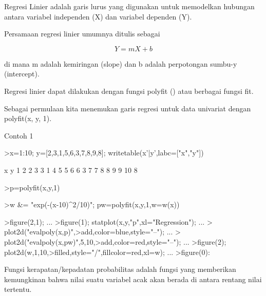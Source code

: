 \documentclass{article}
\begin{document}
\begin{eulernotebook}
\begin{eulercomment}
\begin{eulercomment}
\begin{eulercomment}
\begin{eulercomment}
\begin{eulercomment}
Regresi Linier adalah garis lurus yang digunakan untuk memodelkan
hubungan antara variabel independen (X) dan variabel dependen (Y).

Persamaan regresi linier umumnya ditulis sebagai\\
\end{eulercomment}
\begin{eulerformula}
\[
Y=mX+b
\]
\end{eulerformula}
\begin{eulercomment}
di mana m adalah kemiringan (slope) dan b adalah perpotongan sumbu-y
(intercept).

Regresi linier dapat dilakukan dengan fungsi polyfit () atau berbagai
fungsi fit.

Sebagai permulaan kita menemukan garis regresi untuk data univariat
dengan polyfit(x, y, 1).

\end{eulercomment}
\begin{eulercomment}
Contoh 1
\end{eulercomment}
\begin{eulerprompt}
>x=1:10; y=[2,3,1,5,6,3,7,8,9,8]; writetable(x'|y',labc=["x","y"])
\end{eulerprompt}
\begin{euleroutput}
           x         y
           1         2
           2         3
           3         1
           4         5
           5         6
           6         3
           7         7
           8         8
           9         9
          10         8
\end{euleroutput}
\begin{eulerprompt}
>p=polyfit(x,y,1)
\end{eulerprompt}
\begin{euleroutput}
  [0.733333,  0.812121]
\end{euleroutput}
\begin{eulerprompt}
>w &= "exp(-(x-10)^2/10)"; pw=polyfit(x,y,1,w=w(x))
\end{eulerprompt}
\begin{euleroutput}
  [4.71566,  0.38319]
\end{euleroutput}
\begin{eulerprompt}
>figure(2,1); ...
>figure(1); statplot(x,y,"p",xl="Regression"); ...
>  plot2d("evalpoly(x,p)",>add,color=blue,style="--"); ...
>  plot2d("evalpoly(x,pw)",5,10,>add,color=red,style="--"); ...
>figure(2); plot2d(w,1,10,>filled,style="/",fillcolor=red,xl=w); ...
>figure(0):
\end{eulerprompt}
\begin{eulercomment}
Fungsi kerapatan/kepadatan probabilitas adalah fungsi yang memberikan
kemungkinan bahwa nilai suatu variabel acak akan berada di antara
rentang nilai tertentu.


\end{eulercomment}
\end{eulercomment}
\end{eulercomment}
\end{eulercomment}
\end{eulercomment}
\end{eulernotebook}
\end{document}
